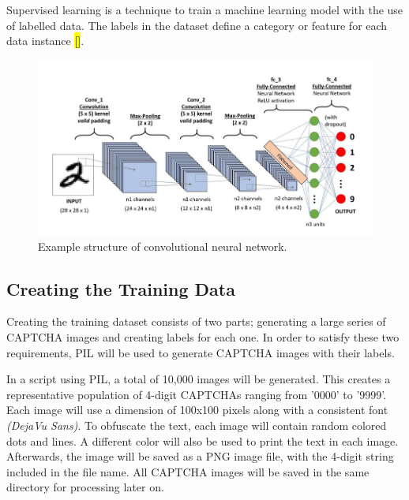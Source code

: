 \documentclass[11pt,conference]{IEEEtran}
\begin{document}
Supervised learning is a technique to train a machine learning model with
the use of labelled data. The labels in the dataset define a category or
feature for each data instance \hl{[]}.

\begin{figure}[htbp]
	\centerline{\includegraphics[scale=0.25]{images/cnn-example.png}}
	\caption{Example structure of convolutional neural network.}
	\label{figure}
\end{figure}


\subsection{Creating the Training Data}
Creating the training dataset consists of two parts; generating a large series
of CAPTCHA images and creating labels for each one. In order to
satisfy these two requirements, PIL will be used to generate CAPTCHA images
with their labels. 

In a script using PIL, a total of 10,000 images will be generated. This creates a representative
population of 4-digit CAPTCHAs ranging from '0000' to '9999'. Each image will use a dimension of 
100x100 pixels along with a consistent font \emph{(DejaVu Sans)}. To obfuscate the
text, each image will contain random colored dots and lines. A different color
will also be used to print the text in each image. Afterwards, the image will be saved
as a PNG image file, with the 4-digit string included in the file name. All
CAPTCHA images will be saved in the same directory for processing later on.

\end{document}
